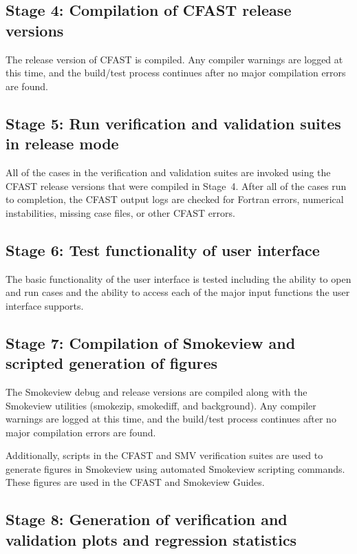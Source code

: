 \documentclass[12pt]{book}
\begin{document}
\subsection*{Stage 4: Compilation of CFAST release versions}

The release version of CFAST is compiled. Any compiler warnings are logged at this time, and the build/test process continues after no major compilation errors are found.

\subsection*{Stage 5: Run verification and validation suites in release mode}

All of the cases in the verification and validation suites are invoked using the CFAST release versions that were compiled in Stage~4. After all of the cases run to completion, the CFAST output logs are checked for Fortran errors, numerical instabilities, missing case files, or other CFAST errors.

\subsection*{Stage 6: Test functionality of user interface}

The basic functionality of the user interface is tested including the ability to open and run cases and the ability to access each of the major input functions the user interface supports.

\subsection*{Stage 7: Compilation of Smokeview and scripted generation of figures}

The Smokeview debug and release versions are compiled along with the Smokeview utilities (smokezip, smokediff, and background). Any compiler warnings are logged at this time, and the build/test process continues after no major compilation errors are found.

Additionally, scripts in the CFAST and SMV verification suites are used to generate figures in Smokeview using automated Smokeview scripting commands. These figures are used in the CFAST and Smokeview Guides.

\subsection*{Stage 8: Generation of verification and validation plots and regression statistics}
\end{document}
